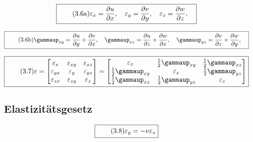\documentclass[11pt]{article}
\newcommand{\1}{ {\mathds{1}} }
\renewcommand{\epsilon}{\varepsilon}
\renewcommand{\gamma  }{\gammaup   }
\begin{document}
		\begin{equation}
			\boxed{
				\tag{3.6a}
				\begin{split}
					\epsilon_x = \frac{\partial u}{\partial x}, \quad
					\epsilon_y = \frac{\partial v}{\partial y}, \quad
					\epsilon_z = \frac{\partial w}{\partial z}, \quad
				\end{split}
			}
		\end{equation}		

		\begin{equation}
			\boxed{
				\tag{3.6b}
				\begin{split}
					\gamma_{xy} = \frac{\partial u}{\partial y} + \frac{\partial v}{\partial x}, \quad
					\gamma_{xz} = \frac{\partial u}{\partial z} + \frac{\partial w}{\partial x}, \quad
					\gamma_{yz} = \frac{\partial v}{\partial z} + \frac{\partial w}{\partial y}, \quad
				\end{split}
			}
		\end{equation}		

		\begin{equation}
			\boxed{
				\tag{3.7}
				\begin{split}
					\mathbf{\epsilon}
					=
					\begin{bmatrix}
						\epsilon_{x } & \epsilon_{xy} & \epsilon_{xz} \\
						\epsilon_{yx} & \epsilon_{y } & \epsilon_{yz} \\
						\epsilon_{zx} & \epsilon_{zy} & \epsilon_{z } 
					\end{bmatrix}
					=
					\begin{bmatrix}
						\epsilon_x & \frac{1}{2}\gamma_{xy} & \frac{1}{2}\gamma_{xz}\\
						\frac{1}{2}\gamma_{xy} & \epsilon_x & \frac{1}{2}\gamma_{yz}\\
						\frac{1}{2}\gamma_{xz} & \frac{1}{2}\gamma_{yz} & \epsilon_z
					\end{bmatrix}
				\end{split}
			}
		\end{equation}

		\subsection{Elastizitätsgesetz}

		\begin{equation}
			\boxed{
				\tag{3.8}
				\begin{split}
			\varepsilon_y = -\nu \varepsilon_x
				\end{split}
			}
		\end{equation}
\end{document}
